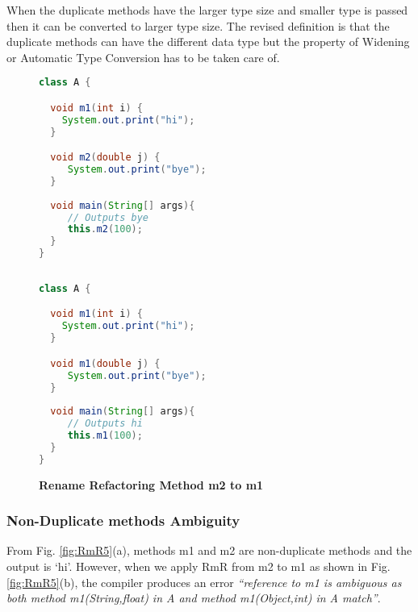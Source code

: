 When the duplicate methods have the larger type size and smaller type is passed then it can be converted to larger type size. The revised definition is that the duplicate methods can have the different data type but the property of Widening or Automatic Type Conversion has to be taken care of.

\begin{figure}[th]
\centering
\begin{minipage}[t]{0.47\linewidth}
\begin{lstlisting}[language=java, basicstyle=\scriptsize\ttfamily,frame=single]
class A {

  void m1(int i) {	
    System.out.print("hi");
  }

  void m2(double j) {	
     System.out.print("bye");
  }	
  
  void main(String[] args){
     // Outputs bye
     this.m2(100); 
  }
}
 
\end{lstlisting}
\end{minipage}
\hfill
\begin{minipage}[t]{0.47\linewidth}
\begin{lstlisting}[language=java, basicstyle=\scriptsize\ttfamily,frame=single]
class A {

  void m1(int i) {	
    System.out.print("hi");
  }

  void m1(double j) {	
     System.out.print("bye");
  }	
  
  void main(String[] args){
     // Outputs hi
     this.m1(100); 
  }
}

\end{lstlisting}
\end{minipage}
\caption{\textbf{Rename Refactoring Method m2 to m1}}
\label{fig:RmR4}
\end{figure}

\subsubsection {Non-Duplicate methods Ambiguity} 
From Fig. \ref{fig:RmR5}(a), methods m1 and m2 are non-duplicate methods and the output is `hi'. However, when we apply RmR from m2 to m1 as shown in Fig. \ref{fig:RmR5}(b), the compiler produces an error \textsl{``reference to m1 is ambiguous as both method m1(String,float) in A and method m1(Object,int) in A match''}. 

